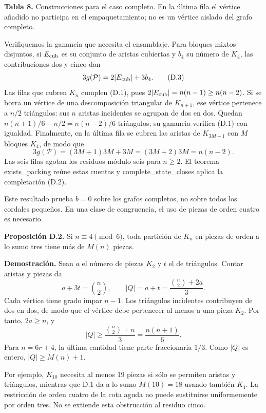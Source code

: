 \documentclass[spanish,11pt,a4paper]{article}
\begin{document}
\textbf{Tabla 8.} Construcciones para el caso completo. En la última fila el vértice añadido no participa en el empaquetamiento; no es un vértice aislado del grafo completo.

Verifiquemos la ganancia que necesita el ensamblaje. Para bloques mixtos disjuntos, si \(E_{\rm cub}\) es su conjunto de aristas cubiertas y \(b_4\) su número de \(K_4\), las contribuciones dos y cinco dan \[
3g(\mathcal P)=2|E_{\rm cub}|+3b_4.
\tag{D.3}
\] Las filas que cubren \(K_n\) cumplen (D.1), pues \(2|E_{\rm cub}|=n(n-1)\ge n(n-2)\). Si se borra un vértice de una descomposición triangular de \(K_{n+1}\), ese vértice pertenece a \(n/2\) triángulos: sus \(n\) aristas incidentes se agrupan de dos en dos. Quedan \(n(n+1)/6-n/2=n(n-2)/6\) triángulos; su ganancia verifica (D.1) con igualdad. Finalmente, en la última fila se cubren las aristas de \(K_{3M+1}\) con \(M\) bloques \(K_4\), de modo que \[
3g(\mathcal P)=(3M+1)3M+3M=(3M+2)3M=n(n-2).
\tag{D.4}
\] Las seis filas agotan los residuos módulo seis para \(n\ge2\). El teorema {\ttfamily\small exists\_\discretionary{\hbox{\ensuremath{\hookrightarrow}}}{}{}packing} reúne estas cuentas y {\ttfamily\small complete\_\discretionary{\hbox{\ensuremath{\hookrightarrow}}}{}{}state\_\discretionary{\hbox{\ensuremath{\hookrightarrow}}}{}{}closes} aplica la completación (D.2).

Este resultado prueba \(b=0\) sobre los grafos completos, no sobre todos los cordales pequeños. En una clase de congruencia, el uso de piezas de orden cuatro es necesario.

\textbf{Proposición D.2.} Si \(n\equiv4\pmod6\), toda partición de \(K_n\) en piezas de orden a lo sumo tres tiene más de \(M(n)\) piezas.

\textbf{Demostración.} Sean \(a\) el número de piezas \(K_2\) y \(t\) el de triángulos. Contar aristas y piezas da \[
a+3t=\binom n2,\qquad |Q|=a+t=\frac{\binom n2+2a}{3}.
\tag{D.5}
\] Cada vértice tiene grado impar \(n-1\). Los triángulos incidentes contribuyen de dos en dos, de modo que el vértice debe pertenecer al menos a una pieza \(K_2\). Por tanto, \(2a\ge n\), y \[
|Q|\ge\frac{\binom n2+n}{3}=\frac{n(n+1)}6.
\] Para \(n=6r+4\), la última cantidad tiene parte fraccionaria \(1/3\). Como \(|Q|\) es entero, \(|Q|\ge M(n)+1\).

Por ejemplo, \(K_{10}\) necesita al menos 19 piezas si sólo se permiten aristas y triángulos, mientras que D.1 da a lo sumo \(M(10)=18\) usando también \(K_4\). La restricción de orden cuatro de la cota aguda no puede sustituirse uniformemente por orden tres. No se extiende esta obstrucción al residuo cinco.
\end{document}
